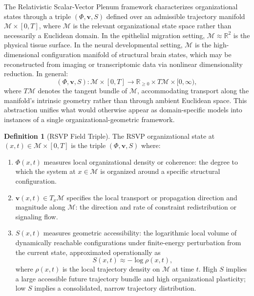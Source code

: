 \documentclass[11pt,a4paper]{article}
\theoremstyle{plain}
\theoremstyle{definition}
\newtheorem{definition}[theorem]{Definition}
\begin{document}
The Relativistic Scalar-Vector Plenum framework characterizes organizational states
through a triple $(\Phi, \mathbf{v}, S)$ defined over an admissible trajectory manifold
$\mathcal{M} \times [0, T]$, where $\mathcal{M}$ is the relevant organizational state
space rather than necessarily a Euclidean domain. In the epithelial migration setting,
$\mathcal{M} \approx \mathbb{R}^2$ is the physical tissue surface. In the neural
developmental setting, $\mathcal{M}$ is the high-dimensional configuration manifold of
structural brain states, which may be reconstructed from imaging or transcriptomic data
via nonlinear dimensionality reduction. In general:
\[
(\Phi, \mathbf{v}, S) : \mathcal{M} \times [0,T] \to \mathbb{R}_{\geq 0} \times
T\mathcal{M} \times [0,\infty),
\]
where $T\mathcal{M}$ denotes the tangent bundle of $\mathcal{M}$, accommodating
transport along the manifold's intrinsic geometry rather than through ambient Euclidean
space. This abstraction unifies what would otherwise appear as domain-specific models
into instances of a single organizational-geometric framework.

\begin{definition}[RSVP Field Triple]
The RSVP organizational state at $(x, t) \in \mathcal{M} \times [0,T]$ is the triple
$(\Phi, \mathbf{v}, S)$ where:
\begin{enumerate}
\item $\Phi(x, t)$ measures local organizational density or coherence: the degree
to which the system at $x \in \mathcal{M}$ is organized around a specific structural
configuration.
\item $\mathbf{v}(x, t) \in T_x\mathcal{M}$ specifies the local transport or propagation
direction and magnitude along $\mathcal{M}$: the direction and rate of constraint
redistribution or signaling flow.
\item $S(x, t)$ measures geometric accessibility: the logarithmic local volume of
dynamically reachable configurations under finite-energy perturbation from the current
state, approximated operationally as
\[
S(x,t) \approx -\log \rho(x,t),
\]
where $\rho(x,t)$ is the local trajectory density on $\mathcal{M}$ at time $t$.
High $S$ implies a large accessible future trajectory bundle and high organizational
plasticity; low $S$ implies a consolidated, narrow trajectory distribution.
\end{enumerate}
\end{definition}
\end{document}
